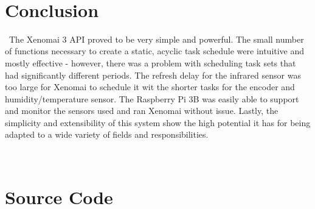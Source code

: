 \documentclass[letterpaper, 12pt]{article}
\begin{document}
~\newpage

\section{Conclusion}

~\indent The Xenomai 3 API proved to be very simple and powerful. The small number of functions necessary to create a static, acyclic task schedule were intuitive and mostly effective - however, there was a problem with scheduling task sets that had significantly different periods. The refresh delay for the infrared sensor was too large for Xenomai to schedule it wit the shorter tasks for the encoder and humidity/temperature sensor. The Raspberry Pi 3B was easily able to support and monitor the sensors used and ran Xenomai without issue. Lastly, the simplicity and extensibility of this system show the high potential it has for being adapted to a wide variety of fields and responsibilities.

\indent 

~\newpage
\printbibliography
~\newpage
\section{Source Code}

\end{document}
